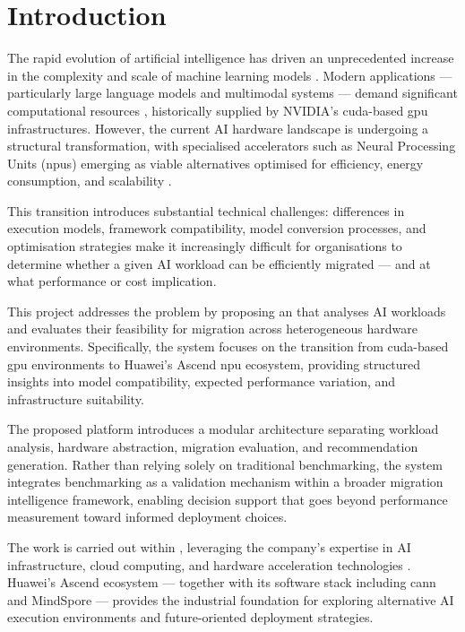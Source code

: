 
\section{Introduction}
\label{sec:introduction}

The rapid evolution of artificial intelligence has driven an unprecedented
increase in the complexity and scale of machine learning models \cite{brown2020gpt3}. Modern
applications — particularly large language models and multimodal systems —
demand significant computational resources \cite{kaplan2020scaling}, historically supplied by
NVIDIA's \acrshort{cuda}-based \acrshort{gpu} infrastructures. However,
the current AI hardware landscape is undergoing a structural transformation,
with specialised accelerators such as Neural Processing Units (\acrshort{npu}s)
emerging as viable alternatives optimised for efficiency, energy consumption,
and scalability \cite{iea2024electricity}.

This transition introduces substantial technical challenges: differences in
execution models, framework compatibility, model conversion processes, and
optimisation strategies make it increasingly difficult for organisations to
determine whether a given AI workload can be efficiently migrated — and at
what performance or cost implication.

This project addresses the problem by proposing an  that analyses AI workloads and evaluates their
feasibility for migration across heterogeneous hardware environments.
Specifically, the system focuses on the transition from \acrshort{cuda}-based
\acrshort{gpu} environments to Huawei's Ascend \acrshort{npu} ecosystem,
providing structured insights into model compatibility, expected performance
variation, and infrastructure suitability.

The proposed platform introduces a modular architecture separating workload
analysis, hardware abstraction, migration evaluation, and recommendation
generation. Rather than relying solely on traditional benchmarking, the system
integrates benchmarking as a validation mechanism within a broader migration
intelligence framework, enabling decision support that goes beyond performance
measurement toward informed deployment choices.

The work is carried out within \CompanyName, leveraging the company's expertise
in AI infrastructure, cloud computing, and hardware acceleration technologies \cite{huawei2025annual}.
Huawei's Ascend ecosystem — together with its software stack including
\acrshort{cann} and MindSpore — provides the industrial foundation for
exploring alternative AI execution environments and future-oriented deployment
strategies.
